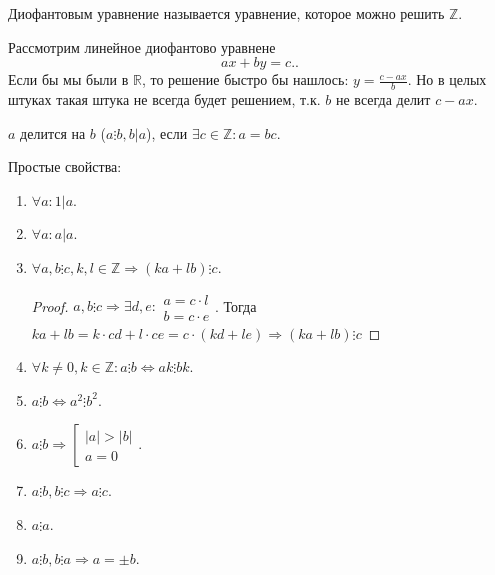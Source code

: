 \begin{definition}
    Диофантовым уравнение называется уравнение, которое можно решить $\mathbb{Z}$.
\end{definition}
Рассмотрим линейное диофантово уравнене \[
 ax+by=c.
.\] 
Если бы мы были в $\mathbb{R}$, то решение быстро бы нашлось: $y = \frac{c - ax}{b}$. Но в целых штуках такая штука не всегда будет решением, т.к. $b$ не всегда делит $c - ax$.
 \begin{definition}
     $a$ делится на $b$ ($a \vdots b, b \vert a$), если $\exists c \in \mathbb{Z}: a = bc$.
\end{definition}
Простые свойства:
\begin{enumerate}
    \item             
            $\forall a: 1 \vert a$.
    \item
            $\forall a: a \vert a$.
    \item
        $\forall a, b \vdots c, k, l \in \mathbb{Z} \Rightarrow (ka + lb) \vdots c$.
            \begin{proof}
                $a, b \vdots c \Rightarrow \exists d, e: \begin{array}{l} a = c \cdot l \\ b = c \cdot e \end{array}$. Тогда  $ka + lb = k \cdot cd + l \cdot ce = c \cdot (kd + le) \Rightarrow (ka + lb) \vdots c$
            \end{proof}
    \item
            $\forall k \neq 0, k \in \mathbb{Z}: a \vdots b \iff ak \vdots bk$.
    \item
            $a \vdots b \iff a^2 \vdots b^2$.
    \item
            $a \vdots b \Rightarrow \left[ \begin{array}{l} |a| > |b| \\ a = 0 \end{array} \right.$.
    \item
            $a \vdots b, b \vdots c \Rightarrow a \vdots c$.
    \item 
            $a \vdots a$.
    \item 
            $a \vdots b, b \vdots a \Rightarrow a = \pm b$.
\end{enumerate}

